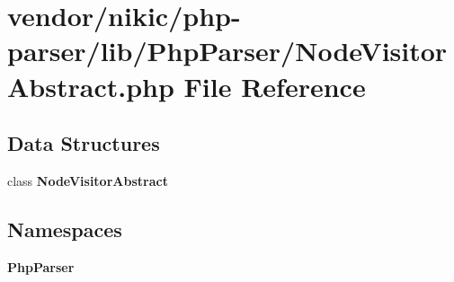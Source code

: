 \section{vendor/nikic/php-\/parser/lib/\+Php\+Parser/\+Node\+Visitor\+Abstract.php File Reference}
\label{_node_visitor_abstract_8php}
\subsection*{Data Structures}
\begin{DoxyCompactItemize}
\item 
class {\bf Node\+Visitor\+Abstract}
\end{DoxyCompactItemize}
\subsection*{Namespaces}
\begin{DoxyCompactItemize}
\item 
 {\bf Php\+Parser}
\end{DoxyCompactItemize}
